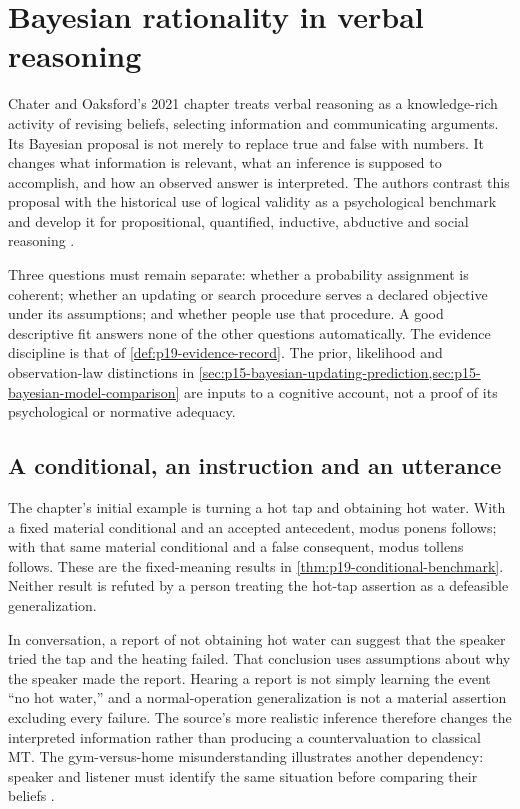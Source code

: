 \chapter{Bayesian rationality in verbal reasoning}
\label{sec:p19-rationality-4-5}

Chater and Oaksford's 2021 chapter treats verbal reasoning as a
knowledge-rich activity of revising beliefs, selecting information and
communicating arguments. Its Bayesian proposal is not merely to replace
true and false with numbers. It changes what information is relevant,
what an inference is supposed to accomplish, and how an observed answer
is interpreted. The authors contrast this proposal with the historical
use of logical validity as a psychological benchmark and develop it for
propositional, quantified, inductive, abductive and social reasoning
\cite[pp.~285--294]{ChaterOaksford2021BayesianReasoning}.

Three questions must remain separate: whether a probability assignment
is coherent; whether an updating or search procedure serves a declared
objective under its assumptions; and whether people use that procedure.
A good descriptive fit answers none of the other questions automatically.
The evidence discipline is that of \cref{def:p19-evidence-record}.
The prior, likelihood and observation-law distinctions in
\cref{sec:p15-bayesian-updating-prediction,sec:p15-bayesian-model-comparison}
are inputs to a cognitive account, not a proof of its psychological or
normative adequacy.

\section{A conditional, an instruction and an utterance}
\label{sec:p19-r45-interpretation}

The chapter's initial example is turning a hot tap and obtaining hot
water. With a fixed material conditional and an accepted antecedent,
modus ponens follows; with that same material conditional and a false
consequent, modus tollens follows. These are the fixed-meaning results
in \cref{thm:p19-conditional-benchmark}. Neither result is refuted by
a person treating the hot-tap assertion as a defeasible generalization.

In conversation, a report of not obtaining hot water can suggest that
the speaker tried the tap and the heating failed. That conclusion uses
assumptions about why the speaker made the report. Hearing a report is
not simply learning the event ``no hot water,'' and a normal-operation
generalization is not a material assertion excluding every failure.
The source's more realistic inference therefore changes the interpreted
information rather than producing a countervaluation to classical MT.
The gym-versus-home misunderstanding illustrates another dependency:
speaker and listener must identify the same situation before comparing
their beliefs \cite[pp.~285--287,290]{ChaterOaksford2021BayesianReasoning}.

